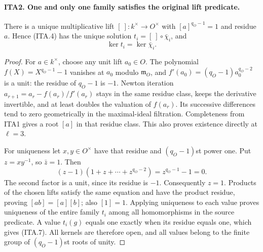 \paragraph{ITA2. One and only one family satisfies the original lift predicate.}
\label{claim:ITA2}
There is a unique multiplicative lift $[\ ]:k^\times\to O^\times$
with $[a]^{q_O-1}=1$ and residue $a$.  Hence (ITA.4) has the
unique solution $t_i=[\ ]\circ\bar\chi_i$, and
\[
                         \ker t_i=\ker\bar\chi_i.       \tag{ITA.7}
\]
\begin{proof}
For $a\in k^\times$, choose any unit lift $a_0\in O$.
The polynomial $f(X)=X^{q_O-1}-1$ vanishes at $a_0$
modulo $\mathfrak m_O$, and
$f'(a_0)=(q_O-1)a_0^{q_O-2}$ is a unit: the residue of
$q_O-1$ is $-1$.  Newton iteration
$a_{r+1}=a_r-f(a_r)/f'(a_r)$ stays in the same residue
class, keeps the derivative invertible, and at least doubles
the valuation of $f(a_r)$.  Its successive differences tend
to zero geometrically in the maximal-ideal filtration.
Completeness from ITA1 gives a root $[a]$ in that residue
class.  This also proves existence directly at $\ell=3$.

For uniqueness let $x,y\in O^\times$ have that residue and
$(q_O-1)$st power one.  Put $z=xy^{-1}$, so $\bar z=1$.
Then
\[
          (z-1)(1+z+\cdots+z^{q_O-2})=z^{q_O-1}-1=0.
\]
The second factor is a unit, since its residue is $-1$.
Consequently $z=1$.  Products of the chosen lifts satisfy
the same equation and have the product residue, proving
$[ab]=[a][b]$; also $[1]=1$.  Applying uniqueness to each
value proves uniqueness of the entire family $t_i$ among
all homomorphisms in the source predicate.  A value $t_i(g)$
equals one exactly when its residue equals one, which gives
(ITA.7).  All kernels are therefore open, and all values
belong to the finite group of $(q_O-1)$st roots of unity.
\end{proof}

